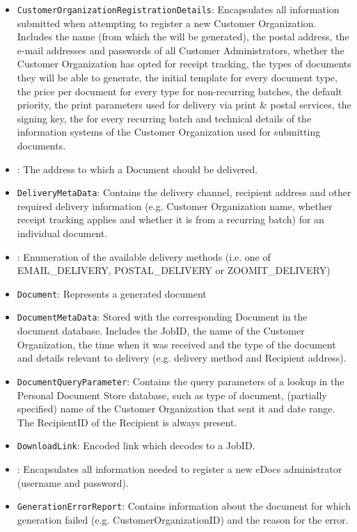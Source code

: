 \begin{itemize}
	\item \texttt{CustomerOrganizationRegistrationDetails}: Encapsulates all information submitted when attempting to register a new Customer Organization. Includes the name (from which the  will be generated), the postal address, the e-mail addresses and passwords of all Customer Administrators, whether the Customer Organization has opted for receipt tracking, the types of documents they will be able to generate, the initial template for every document type, the price per document for every type for non-recurring batches, the default priority, the print parameters used for delivery via print \& postal services, the signing key, the  for every recurring batch and technical details of the information systems of the Customer Organization used for submitting documents.
	\item {}: The address to which a Document should be delivered.
	\item \texttt{DeliveryMetaData}: Contains the delivery channel, recipient address and other required delivery information (e.g. Customer Organization name, whether receipt tracking applies and whether it is from a recurring batch) for an individual document.
	\item {}: Enumeration of the available delivery methods (i.e. one of EMAIL\_DELIVERY, POSTAL\_DELIVERY or ZOOMIT\_DELIVERY)
	\item \texttt{Document}: Represents a generated document
	\item \texttt{DocumentMetaData}: Stored with the corresponding Document in the document database. Includes the JobID, the name of the Customer Organization, the time when it was received and the type of the document and details relevant to delivery (e.g. delivery method and Recipient address).
	\item \texttt{DocumentQueryParameter}: Contains the query parameters of a lookup in the Personal Document Store database, such as type of document, (partially specified) name of the Customer Organization that sent it and date range. The RecipientID of the Recipient is always present.
	\item \texttt{DownloadLink}: Encoded link which decodes to a JobID.
	\item {}: Encapsulates all information needed to register a new eDocs administrator (username and password).
	\item \texttt{GenerationErrorReport}: Contains information about the document for which generation failed (e.g. CustomerOrganizationID) and the reason for the error.

\end{itemize}
